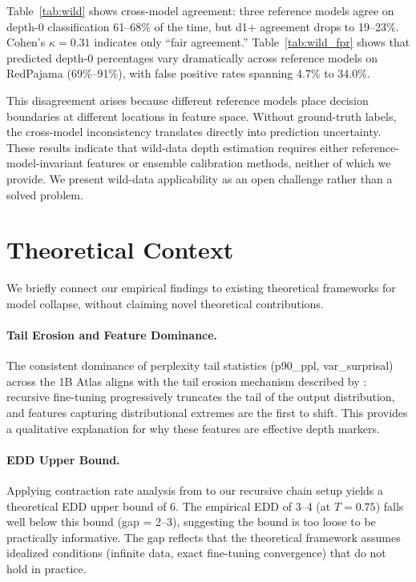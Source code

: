 \documentclass[11pt,a4paper]{article}
\begin{document}
Table~\ref{tab:wild} shows cross-model agreement: three reference models agree on depth-0 classification 61--68\% of the time, but d1+ agreement drops to 19--23\%. Cohen's $\kappa = 0.31$ indicates only ``fair agreement.'' Table~\ref{tab:wild_fpr} shows that predicted depth-0 percentages vary dramatically across reference models on RedPajama (69\%--91\%), with false positive rates spanning 4.7\% to 34.0\%.

This disagreement arises because different reference models place decision boundaries at different locations in feature space. Without ground-truth labels, the cross-model inconsistency translates directly into prediction uncertainty. These results indicate that wild-data depth estimation requires either reference-model-invariant features or ensemble calibration methods, neither of which we provide. We present wild-data applicability as an open challenge rather than a solved problem.

\section{Theoretical Context}

We briefly connect our empirical findings to existing theoretical frameworks for model collapse, without claiming novel theoretical contributions.

\paragraph{Tail Erosion and Feature Dominance.}
The consistent dominance of perplexity tail statistics (p90\_ppl, var\_surprisal) across the 1B Atlas aligns with the tail erosion mechanism described by \citet{shumailov2024model}: recursive fine-tuning progressively truncates the tail of the output distribution, and features capturing distributional extremes are the first to shift. This provides a qualitative explanation for why these features are effective depth markers.

\paragraph{EDD Upper Bound.}
Applying contraction rate analysis from \citet{dohmatob2024tale} to our recursive chain setup yields a theoretical EDD upper bound of 6. The empirical EDD of 3--4 (at $T{=}0.75$) falls well below this bound (gap = 2--3), suggesting the bound is too loose to be practically informative. The gap reflects that the theoretical framework assumes idealized conditions (infinite data, exact fine-tuning convergence) that do not hold in practice.
\end{document}
